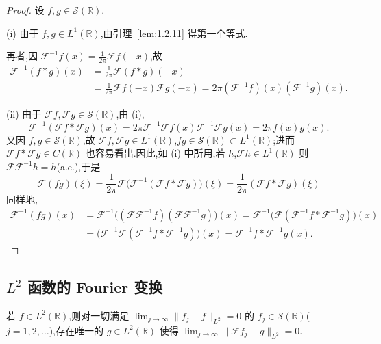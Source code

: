 \begin{proof}
设 $f, g \in \mathcal{S}(\mathbb{R})$.

(i) 由于 $f, g \in L^{1}(\mathbb{R})$,由引理~\ref{lem:1.2.11} 得第一个等式.

再者,因 $\mathcal{F}^{-1}f(x) = \frac{1}{2\pi}\mathcal{F}f(-x)$,故
\begin{align*}
\mathcal{F}^{-1}(f * g)(x) & = \frac{1}{2\pi}\mathcal{F}(f * g)(-x) \\
& = \frac{1}{2\pi}\mathcal{F}f(-x)\mathcal{F}g(-x) = 2\pi(\mathcal{F}^{-1}f)(x)(\mathcal{F}^{-1}g)(x).
\end{align*}

(ii) 由于 $\mathcal{F}f, \mathcal{F}g \in \mathcal{S}(\mathbb{R})$,由 (i),
\begin{equation*}
\mathcal{F}^{-1}(\mathcal{F}f * \mathcal{F}g)(x) = 2\pi\mathcal{F}^{-1}\mathcal{F}f(x)\mathcal{F}^{-1}\mathcal{F}g(x) = 2\pi f(x)g(x).
\end{equation*}
又因 $f, g \in \mathcal{S}(\mathbb{R})$,故 $\mathcal{F}f, \mathcal{F}g \in L^{1}(\mathbb{R})$,$fg \in \mathcal{S}(\mathbb{R}) \subset L^{1}(\mathbb{R})$;进而 $\mathcal{F}f * \mathcal{F}g \in C(\mathbb{R})$ 也容易看出.因此,如 (i) 中所用,若 $h$,$\mathcal{F}h \in L^{1}(\mathbb{R})$ 则 $\mathcal{F}\mathcal{F}^{-1}h = h$(a.e.),于是
\begin{equation*}
\mathcal{F}(fg)(\xi) = \frac{1}{2\pi}\mathcal{F}\bigl(\mathcal{F}^{-1}(\mathcal{F}f * \mathcal{F}g)\bigr)(\xi) = \frac{1}{2\pi}(\mathcal{F}f * \mathcal{F}g)(\xi)
\end{equation*}
同样地,
\begin{align*}
\mathcal{F}^{-1}(fg)(x) & = \mathcal{F}^{-1}\bigl((\mathcal{F}\mathcal{F}^{-1}f)(\mathcal{F}\mathcal{F}^{-1}g)\bigr)(x) = \mathcal{F}^{-1}\bigl(\mathcal{F}(\mathcal{F}^{-1}f * \mathcal{F}^{-1}g)\bigr)(x) \\
& = \bigl(\mathcal{F}^{-1}\mathcal{F}(\mathcal{F}^{-1}f * \mathcal{F}^{-1}g)\bigr)(x) = \mathcal{F}^{-1}f * \mathcal{F}^{-1}g(x).
\end{align*}
\end{proof}

\subsection{\texorpdfstring{$L^2$ 函数的 Fourier 变换}{L2 函数的 Fourier 变换}}\label{sec:1.2.2}

\begin{lemma}\label{lem:1.2.13}
若 $f \in L^{2}(\mathbb{R})$,则对一切满足 $\lim_{j \to \infty}\|f_{j} - f\|_{L^{2}} = 0$ 的 $f_{j} \in \mathcal{S}(\mathbb{R})$($j = 1, 2, \ldots$),存在唯一的 $g \in L^{2}(\mathbb{R})$ 使得 $\lim_{j \to \infty}\|\mathcal{F}f_{j} - g\|_{L^{2}} = 0$.
\end{lemma}

